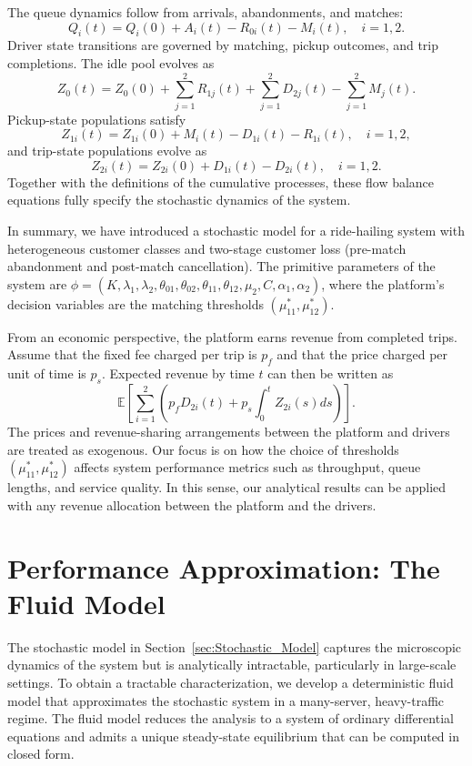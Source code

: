 The queue dynamics follow from arrivals, abandonments, and matches:
\begin{equation}
Q_i(t) = Q_i(0) + A_i(t) - R_{0i}(t) - M_i(t), \quad i=1,2. \label{eq:Qi}
\end{equation}
Driver state transitions are governed by matching, pickup outcomes, and trip completions.
The idle pool evolves as
\begin{equation}
Z_0(t) = Z_0(0) + \sum_{j=1}^2 R_{1j}(t) + \sum_{j=1}^2 D_{2j}(t) - \sum_{j=1}^2 M_j(t). \label{eq:Z0}
\end{equation}
Pickup-state populations satisfy
\begin{equation}
Z_{1i}(t) = Z_{1i}(0) + M_i(t) - D_{1i}(t) - R_{1i}(t), \quad i=1,2, \label{eq:Z1i}
\end{equation}
and trip-state populations evolve as
\begin{equation}
Z_{2i}(t) = Z_{2i}(0) + D_{1i}(t) - D_{2i}(t), \quad i=1,2. \label{eq:Z2i}
\end{equation}
Together with the definitions of the cumulative processes, these flow balance equations fully specify the stochastic dynamics of the system.

In summary, we have introduced a stochastic model for a ride-hailing system with heterogeneous customer classes and two-stage customer loss (pre-match abandonment and post-match cancellation).
The primitive parameters of the system are $\phi = (K, \lambda_1, \lambda_2, \theta_{01}, \theta_{02}, \theta_{11}, \theta_{12}, \mu_2, C, \alpha_1, \alpha_2)$, where the platform's decision variables are the matching thresholds $(\mu_{11}^*, \mu_{12}^*)$.

From an economic perspective, the platform earns revenue from completed trips.
Assume that the fixed fee charged per trip is $p_f$ and that the price charged per unit of time is $p_s$.
Expected revenue by time $t$ can then be written as
\begin{equation}
\mathbb{E}\left[\sum_{i=1}^2 \left(p_f D_{2i}(t) + p_s \int_0^t Z_{2i}(s) ds\right)\right]. \label{eq:revenue}
\end{equation}
The prices and revenue-sharing arrangements between the platform and drivers are treated as exogenous.
Our focus is on how the choice of thresholds $(\mu^*_{11}, \mu^*_{12})$ affects system performance metrics such as throughput, queue lengths, and service quality.
In this sense, our analytical results can be applied with any revenue allocation between the platform and the drivers.

\section{Performance Approximation: The Fluid Model}\label{sec:Fluid_Model}
The stochastic model in Section~\ref{sec:Stochastic_Model} captures the microscopic dynamics of the system but is analytically intractable, particularly in large-scale settings.
To obtain a tractable characterization, we develop a deterministic fluid model that approximates the stochastic system in a many-server, heavy-traffic regime.
The fluid model reduces the analysis to a system of ordinary differential equations and admits a unique steady-state equilibrium that can be computed in closed form.

